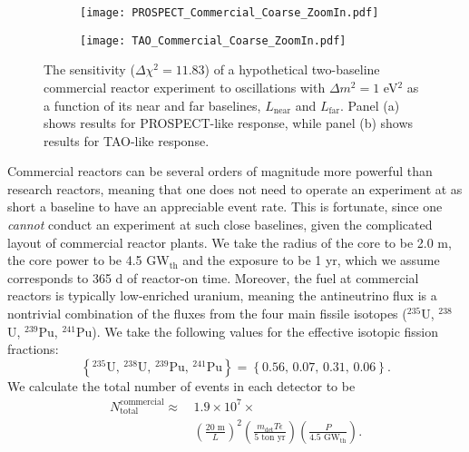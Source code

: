 \documentclass[prd, twocolumn, tightenlines, twoside, secnumarabic, superscriptaddress, preprintnumbers, nofootinbib, notitlepage]{revtex4-1}
\begin{document}
\begin{figure*}
\begin{subfigure}[t]{0.45\textwidth}
    \centering
    \texttt{[image: PROSPECT\_Commercial\_Coarse\_ZoomIn.pdf]}
    \caption{}
    \label{fig:prospect_commerical}
\end{subfigure}
%
\hspace{5mm}
%
\begin{subfigure}[t]{0.45\textwidth}
    \centering
    \texttt{[image: TAO\_Commercial\_Coarse\_ZoomIn.pdf]}
    \caption{}
    \label{fig:tao_commercial}
\end{subfigure}
\caption{The sensitivity ($\Delta \chi^2 = 11.83$) of a hypothetical two-baseline commercial reactor experiment to oscillations with $\Delta m^2 = 1$ eV$^2$ as a function of its near and far baselines, $L_\text{near}$ and $L_\text{far}$. Panel (a) shows results for PROSPECT-like response, while panel (b) shows results for TAO-like response.}
\end{figure*}

Commercial reactors can be several orders of magnitude more powerful than research reactors, meaning that one does not need to operate an experiment at as short a baseline to have an appreciable event rate. This is fortunate, since one \emph{cannot} conduct an experiment at such close baselines, given the complicated layout of commercial reactor plants. We take the radius of the core to be 2.0 m, the core power to be 4.5 GW$_\text{th}$ and the exposure to be 1 yr, which we assume corresponds to 365 d of reactor-on time. Moreover, the fuel at commercial reactors is typically low-enriched uranium, meaning the antineutrino flux is a nontrivial combination of the fluxes from the four main fissile isotopes ($^{235}$U, $^{238}$U, $^{239}$Pu, $^{241}$Pu). We take the following values for the effective isotopic fission fractions:
\begin{equation*}
 \left\{^{235}\text{U},\,^{238}\text{U},\,^{239}\text{Pu},\,^{241}\text{Pu}\right\}=\left\{0.56,\,0.07,\,0.31,\,0.06 \right\}.
\end{equation*}
We calculate the total number of events in each detector to be
\begin{align}
    N_\text{total}^\text{commercial} \approx \, & 1.9 \times 10^{7} \times \\
    & \left( \frac{\text{20 m}}{L} \right)^2 \left( \frac{m_\text{det} T \epsilon}{\text{5 ton yr}} \right) \left( \frac{P}{\text{4.5 GW}_{\text{th}}} \right). \nonumber
\end{align}
\end{document}
